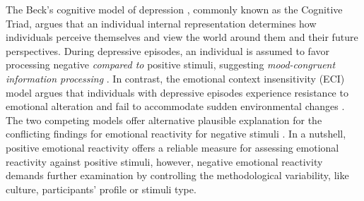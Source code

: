 \documentclass{Interspeech2024}
\begin{document}
The Beck's cognitive model of depression \cite{Beck2008}, commonly known as the Cognitive Triad, argues that an individual internal representation determines how individuals perceive themselves and view the world around them and their future perspectives. During depressive episodes, an individual is assumed to favor processing negative \textit{compared to} positive stimuli, suggesting \textit{mood-congruent information processing} \cite{Beck2008, Bower1981}. In contrast, the emotional context insensitivity (ECI) model \cite{Rottenberg2017} argues that individuals with depressive episodes experience resistance to emotional alteration and fail to accommodate sudden environmental changes \cite{Bylsma2008, Rottenberg2017, Kuppens2010}. The two competing models offer alternative plausible explanation for the conflicting findings for emotional reactivity for negative stimuli \cite{Sheoran2022, Bylsma2008, koch2018neural, kujawa2017vulnerability}. In a nutshell, positive emotional reactivity offers a reliable measure for assessing emotional reactivity against positive stimuli, however, negative emotional reactivity demands further examination by controlling the methodological variability, like culture, participants' profile or stimuli type.
\end{document}
